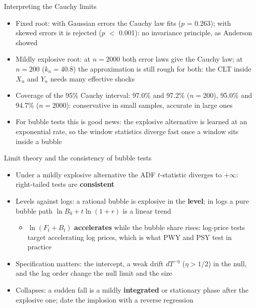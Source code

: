 \begin{frame}{Interpreting the Cauchy limits}
\itemsize{\small}
\begin{itemize}
    \item Fixed root: with Gaussian errors the Cauchy law fits ($p$ = 0.263); with skewed errors it is rejected ($p$ $<$ 0.001): no invariance principle, as Anderson showed
    \item Mildly explosive root: at $n = 2000$ both error laws give the Cauchy law; at $n = 200$ ($k_n = 40.8$) the approximation is still rough for both: the CLT inside $X_n$ and $Y_n$ needs many effective shocks
    \item Coverage of the 95\% Cauchy interval: 97.0\% and 97.2\% ($n = 200$), 95.0\% and 94.7\% ($n = 2000$): conservative in small samples, accurate in large ones
    \item For bubble tests this is good news: the explosive alternative is learned at an exponential rate, so the window statistics diverge fast once a window sits inside a bubble
\end{itemize}
\end{frame}

\begin{frame}{Limit theory and the consistency of bubble tests}
\itemsize{\small}
\begin{itemize}
    \item Under a mildly explosive alternative the ADF $t$-statistic diverges to $+\infty$: right-tailed tests are \textbf{consistent} 
    \item Levels against logs: a rational bubble is explosive in the \textbf{level}; in logs a pure bubble path $\ln B_0 + t\ln(1 + r)$ is a linear trend
    \begin{itemize}
        \item $\ln(F_t + B_t)$ \textbf{accelerates} while the bubble share rises: log-price tests target accelerating log prices, which is what PWY and PSY test in practice
    \end{itemize}
    \item Specification matters: the intercept, a weak drift $dT^{-\eta}$ ($\eta > 1/2$) in the null, and the lag order change the null limit and the size 
    \item Collapses: a sudden fall is a mildly \textbf{integrated} or stationary phase after the explosive one;  date the implosion with a reverse regression
\end{itemize}
\end{frame}

